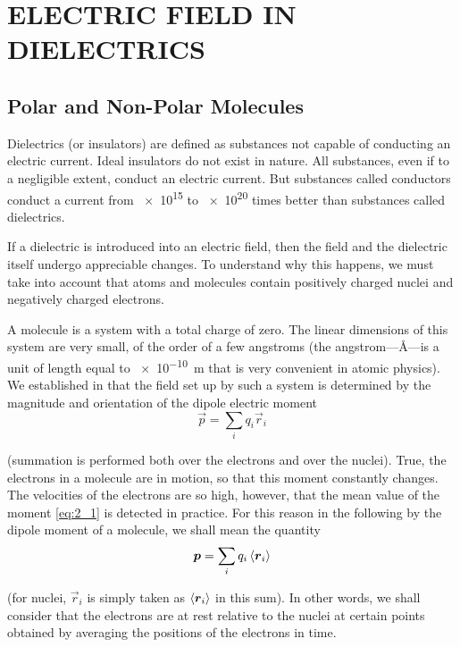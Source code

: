 

\chapter{ELECTRIC FIELD IN DIELECTRICS}\label{chap:2}

\section{Polar and Non-Polar Molecules}\label{sec:2_1}

Dielectrics (or insulators) are defined as substances not capable of conducting an electric current. Ideal insulators do not exist in nature. All substances, even if to a negligible extent, conduct an electric current. But substances called conductors conduct a current from \num{e15} to \num{e20} times better than substances called dielectrics.

If a dielectric is introduced into an electric field, then the field and the dielectric itself undergo appreciable changes. To understand why this happens, we must take into account that atoms and molecules contain positively charged nuclei and negatively charged electrons.

A molecule is a system with a total charge of zero. The linear dimensions of this system are very small, of the order of a few angstroms (the angstrom---\si{\angstrom}---is a unit of length equal to \SI{e-10}{\metre} that is very convenient in atomic physics). We established in  that the field set up by such a system is determined by the magnitude and orientation of the dipole electric moment
\begin{equation}\label{eq:2_1}
    \vec{p} = \sum_i q_i \vec{r}_i
\end{equation}

\noindent
(summation is performed both over the electrons and over the nuclei). True, the electrons in a molecule are in motion, so that this moment constantly changes. The velocities of the electrons are so high, however, that the mean value of the moment \eqref{eq:2_1} is detected in practice. For this reason in the following by the dipole moment of a molecule, we shall mean the quantity
\begin{equation}\label{eq:2_2}
    \boldsymbol{p} = \sum_i q_i \left\langle \boldsymbol{r}_i \right\rangle
\end{equation}

\noindent
(for nuclei, $\vec{r}_i$ is simply taken as $\left\langle \boldsymbol{r}_i \right\rangle$ in this sum). In other words, we shall consider that the electrons are at rest relative to the nuclei at certain points obtained by averaging the positions of the electrons in time.

